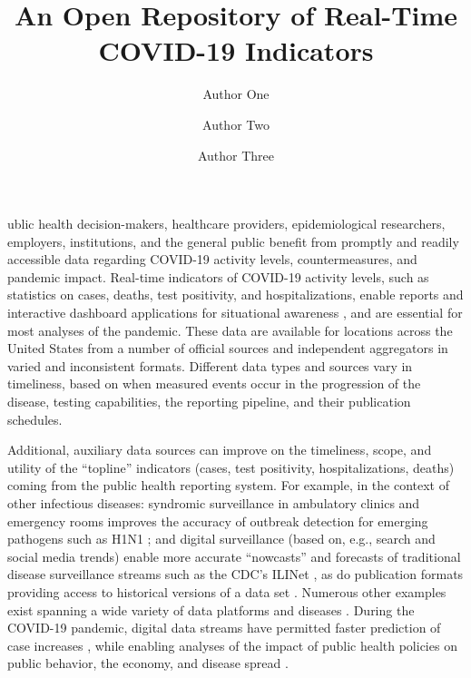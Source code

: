 \documentclass[9pt,twocolumn,twoside,lineno]{pnas-new}
\title{An Open Repository of Real-Time COVID-19 Indicators}
\author[a,c,1]{Author One}
\author[b,1,2]{Author Two}
\author[a]{Author Three}
\affil[a]{Affiliation One}
\affil[b]{Affiliation Two}
\affil[c]{Affiliation Three}
\begin{document}
\maketitle
\thispagestyle{firststyle}

ublic health decision-makers, healthcare providers, epidemiological
researchers, employers, institutions, and the general public benefit from
promptly and readily accessible data regarding COVID-19 activity levels,
countermeasures, and pandemic impact.  Real-time indicators of COVID-19 activity
levels, such as statistics on cases, deaths, test positivity, and
hospitalizations, enable reports and interactive dashboard applications for
situational awareness \cite{Dong:2020, NYTimes, USAFacts}, and are essential for
most analyses of the pandemic.  These data are available for locations across
the United States from a number of official sources and independent aggregators
in varied and inconsistent formats.  Different data types and sources vary in
timeliness, based on when measured events occur in the progression of the
disease, testing capabilities, the reporting pipeline, and their publication
schedules.

Additional, auxiliary data sources can improve on the timeliness, scope, and
utility of the ``topline'' indicators (cases, test positivity, hospitalizations,
deaths) coming from the public health reporting system. For example, in the
context of other infectious diseases: syndromic surveillance in ambulatory
clinics and emergency rooms improves the accuracy of outbreak detection for
emerging pathogens such as H1N1 \cite{Kass-Hout:2012}; and digital surveillance
(based on, e.g., search and social media trends) enable more accurate
``nowcasts'' and forecasts of traditional disease surveillance streams such as
the CDC's ILINet \cite{Santillana:2015, Farrow:2016}, as do publication formats
providing access to historical versions of a data set \cite{Brooks:2018,
  Brooks:2020}. Numerous other examples exist spanning a wide variety of data
platforms and diseases \cite{Browstein:2009, Kass-Hout:2011, Salathe:2012,
  Kass-Hout:2013}. During the COVID-19 pandemic, digital data streams have
permitted faster prediction of case increases \cite{Ahmad:2020, Kogan:2021},
while enabling analyses of the impact of public health policies on public
behavior, the economy, and disease spread \cite{Bonaccorsi:2020, Nouvellet:2021,
  Adjodah:2021, Jewell:2021}.
\end{document}
